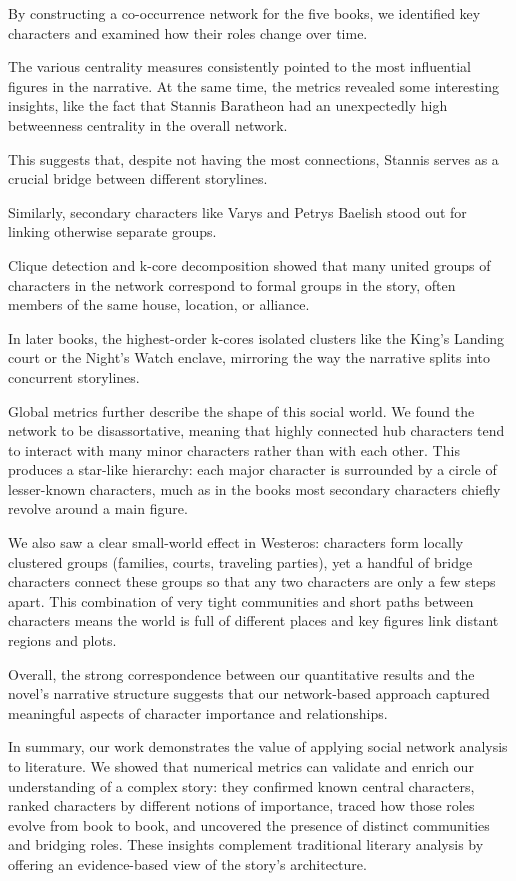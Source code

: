 \documentclass[12pt, a4paper]{article}
\begin{document}
By constructing a co-occurrence network for the five books, we identified key characters and examined how their roles change over time.

The various centrality measures consistently pointed to the most influential figures in the narrative.  At the same time, the metrics revealed some interesting insights, like the fact that Stannis Baratheon had an unexpectedly high betweenness centrality in the overall network.

This suggests that, despite not  having the most connections, Stannis serves as a crucial bridge between different storylines.

Similarly, secondary characters like Varys and Petrys Baelish stood out for linking otherwise separate groups.




Clique detection and k-core decomposition showed that many united groups of characters in the network correspond to formal groups in the story,
 often members of the same house, location, or alliance. 
 
 In later books, the highest-order k-cores isolated clusters like the King’s Landing court or the Night’s Watch enclave, 
 mirroring the way the narrative splits into concurrent storylines. 

 Global metrics further describe the shape of this social world. 
 We found the network to be disassortative, meaning that highly connected hub characters tend to interact with many minor characters rather than with each other. 
 This produces a star-like hierarchy: each major character is surrounded by a circle of lesser-known characters, 
 much as in the books most secondary characters chiefly revolve around a main figure. 

 We also saw a clear small-world effect in Westeros: characters form locally clustered groups 
 (families, courts, traveling parties), 
 yet a handful of bridge characters connect these groups so that any two 
 characters are only a few steps apart. 
 This combination of very tight communities and short paths between 
 characters means 
 the world is full of different places and key figures link distant regions and plots. 
 
 Overall, the strong correspondence between our quantitative results and 
 the novel’s narrative structure suggests that 
 our network-based approach captured meaningful aspects 
 of character importance and relationships.

In summary, our work demonstrates the value of applying social network analysis to literature. We showed that numerical metrics can validate 
and enrich our understanding of a complex story: 
they confirmed known central characters, ranked characters by different notions of importance, 
traced how those roles evolve from book to book, and uncovered the presence of distinct communities and bridging roles. 
These insights complement traditional literary analysis by offering an evidence-based view of the story’s architecture. 
\end{document}
